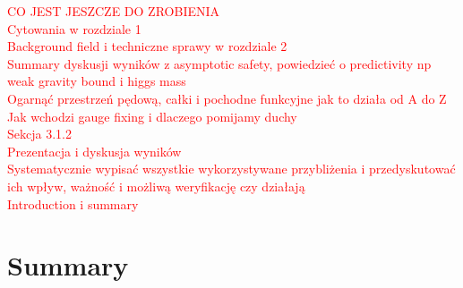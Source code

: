 \documentclass[11pt, a4paper]{article}
\begin{document}
\textcolor{red}{
CO JEST JESZCZE DO ZROBIENIA\\
Cytowania w rozdziale 1\\
Background field i techniczne sprawy w rozdziale 2\\
Summary dyskusji wyników z asymptotic safety, powiedzieć o predictivity np weak gravity bound i higgs mass\\
Ogarnąć przestrzeń pędową, całki i pochodne funkcyjne jak to działa od A do Z\\
Jak wchodzi gauge fixing i dlaczego pomijamy duchy\\
Sekcja 3.1.2\\
Prezentacja i dyskusja wyników\\
Systematycznie wypisać wszystkie wykorzystywane przybliżenia i przedyskutować ich wpływ, ważność i możliwą weryfikację czy działają\\
Introduction i summary
}


\section*{Summary}
\end{document}
